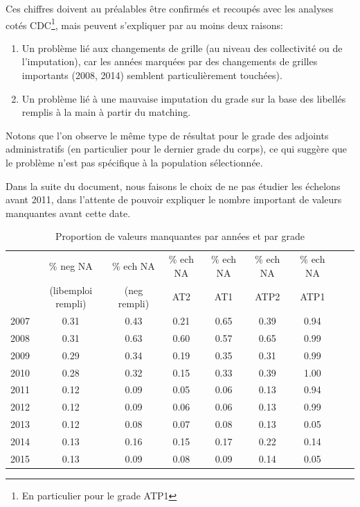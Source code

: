 \documentclass[11pt,a4paper]{article}
\begin{document}
Ces chiffres doivent au préalables être confirmés et recoupés avec les analyses cotés CDC\footnote{En particulier pour le grade ATP1}, mais peuvent s'expliquer par au moins deux raisons: 
\begin{enumerate}
\item Un problème lié aux changements de grille (au niveau des collectivité ou de l'imputation), car les années marquées par des changements de grilles importants (2008, 2014) semblent particulièrement touchées). 
\item Un problème lié à une mauvaise imputation du grade sur la base des libellés remplis à la main à partir du matching. 
\end{enumerate}

Notons que l'on observe le même type de résultat pour le grade des adjoints administratifs (en particulier pour le dernier grade du corps), ce qui suggère que le problème n'est pas spécifique à la population sélectionnée.

Dans la suite du document, nous faisons le choix de ne pas étudier les échelons avant 2011, dans l'attente de pouvoir expliquer le nombre important de valeurs manquantes avant cette date. 



\begin{table}[h!]
\centering
\caption{Proportion de valeurs manquantes par années et par grade} 
\label{quality1}
\begin{tabular}{lcccccccc}
\toprule
& \% neg NA  & \% ech NA & \% ech NA   & \% ech NA   & \% ech NA  & \% ech NA  \\ 
& (libemploi rempli) & (neg rempli) & AT2 & AT1 & ATP2 & ATP1 \\
  \midrule 
2007 & 0.31 & 0.43 & 0.21 & 0.65 & 0.39 & 0.94 \\ 
  2008 & 0.31 & 0.63 & 0.60 & 0.57 & 0.65 & 0.99 \\ 
  2009 & 0.29 & 0.34 & 0.19 & 0.35 & 0.31 & 0.99 \\ 
  2010 & 0.28 & 0.32 & 0.15 & 0.33 & 0.39 & 1.00 \\ 
  2011 & 0.12 & 0.09 & 0.05 & 0.06 & 0.13 & 0.94 \\ 
  2012 & 0.12 & 0.09 & 0.06 & 0.06 & 0.13 & 0.99 \\ 
  2013 & 0.12 & 0.08 & 0.07 & 0.08 & 0.13 & 0.05 \\ 
  2014 & 0.13 & 0.16 & 0.15 & 0.17 & 0.22 & 0.14 \\ 
  2015 & 0.13 & 0.09 & 0.08 & 0.09 & 0.14 & 0.05 \\ 
\bottomrule
\end{tabular}
\end{table}
\end{document}
